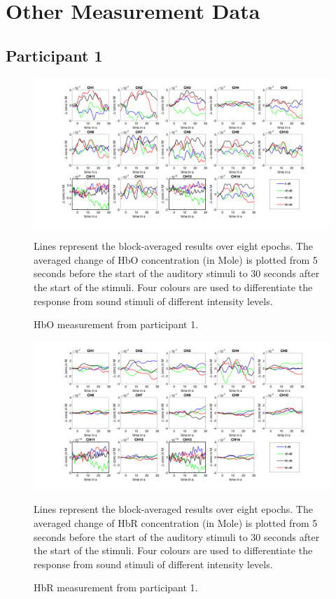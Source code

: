 \chapter{Other Measurement Data}

\section {Participant 1}
\begin{figure}[H]
  \centering
    \includegraphics[scale=.4]{bilder/HbO_Mole/sub_chang_s_HbO.png}
  \caption{HbO measurement from participant 1.}
  \label{fig:somesignal}
  \medskip
  \footnotesize {Lines represent the block-averaged results over eight epochs. The averaged change of HbO concentration (in Mole) is plotted from 5 seconds before the start of the auditory stimuli to 30 seconds after the start of the stimuli. Four colours are used to differentiate the response from sound stimuli of different intensity levels.}
\end{figure}

\newpage

\begin{figure}[H]
  \centering
    \includegraphics[scale=.4]{bilder/HbR_Mole/sub_chang_s_HbR.png}
  \caption{HbR measurement from participant 1.}
  \label{fig:somesignal}
  \medskip
  \footnotesize {Lines represent the block-averaged results over eight epochs. The averaged change of HbR concentration (in Mole) is plotted from 5 seconds before the start of the auditory stimuli to 30 seconds after the start of the stimuli. Four colours are used to differentiate the response from sound stimuli of different intensity levels.}
\end{figure}

